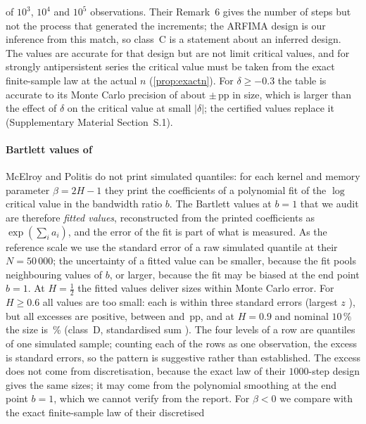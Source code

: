 of $10^3$, $10^4$ and $10^5$ observations. Their Remark~6 gives the number of steps but not the process that generated
the increments; the ARFIMA design is our inference from this match, so class~C is a statement about an inferred design.
The values are accurate for that design but are not limit critical values, and for strongly antipersistent series the critical value
must be taken from the exact finite-sample law at the actual $n$ (\cref{prop:exactn}). For $\delta\ge-0.3$ the table is
accurate to its Monte Carlo precision of about $\pm$\,pp in size, which is larger than the effect
of $\delta$ on the critical value at small $|\delta|$; the certified values replace it (Supplementary Material Section~S.1).

\paragraph{Bartlett values of \citet{MP09}} McElroy and Politis do not print simulated quantiles: for each kernel and
memory parameter $\beta=2H-1$ they print the coefficients of a polynomial fit of the $\log$ critical value in the
bandwidth ratio $b$. The Bartlett values at $b=1$ that we audit are therefore \emph{fitted values}, reconstructed from
the printed coefficients as $\exp(\sum_ia_i)$, and the error of the fit is part of what is measured. As the reference
scale we use the standard error of a raw simulated quantile at their $N=50\,000$; the uncertainty of a fitted value can
be smaller, because the fit pools neighbouring values of $b$, or larger, because the fit may be biased at the end point
$b=1$. At $H=\frac12$ the fitted
values deliver sizes within Monte Carlo error. For $H\ge0.6$ all  values are too small: each is
within three standard errors (largest $z$ ), but all  excesses are
positive, between  and \,pp, and at $H=0.9$ and nominal $10\,\%$ the
size is \,\% (class~D, standardised sum ). The four levels of a row are
quantiles of one simulated sample; counting each of the  rows as one observation, the excess is
 standard errors, so the pattern is suggestive rather than established. The excess does not
come from discretisation, because the exact law of
their $1000$-step design gives the same sizes; it may come from the polynomial smoothing at the end point $b=1$, which
we cannot verify from the report. For $\beta<0$ we compare with the exact finite-sample law of their discretised
